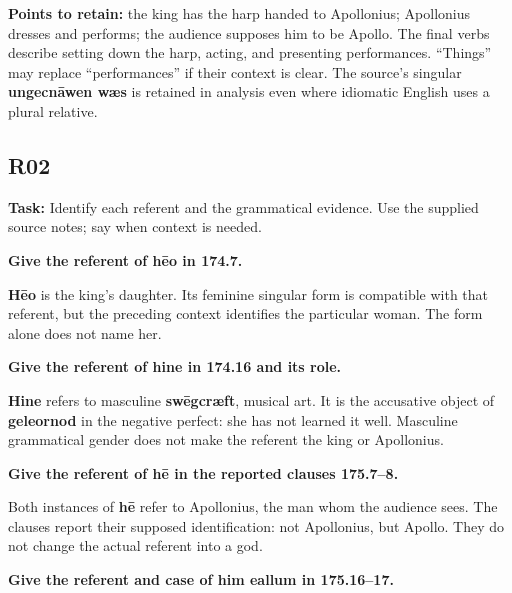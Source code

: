 \textbf{Points to retain:} the king has the harp handed to Apollonius; Apollonius dresses and performs; the audience supposes him to be Apollo. The final verbs describe setting down the harp, acting, and presenting performances. “Things” may replace “performances” if their context is clear. The source's singular \textbf{ungecnāwen wæs} is retained in analysis even where idiomatic English uses a plural relative.

\subsection*{R02}

\textbf{Task:} Identify each referent and the grammatical evidence. Use the supplied source notes; say when context is needed.

\textbf{Give the referent of hēo in 174.7.}

\textbf{Hēo} is the king's daughter. Its feminine singular form is compatible with that referent, but the preceding context identifies the particular woman. The form alone does not name her.

\textbf{Give the referent of hine in 174.16 and its role.}

\textbf{Hine} refers to masculine \textbf{swēgcræft}, musical art. It is the accusative object of \textbf{geleornod} in the negative perfect: she has not learned it well. Masculine grammatical gender does not make the referent the king or Apollonius.

\textbf{Give the referent of hē in the reported clauses 175.7–8.}

Both instances of \textbf{hē} refer to Apollonius, the man whom the audience sees. The clauses report their supposed identification: not Apollonius, but Apollo. They do not change the actual referent into a god.

\textbf{Give the referent and case of him eallum in 175.16–17.}


